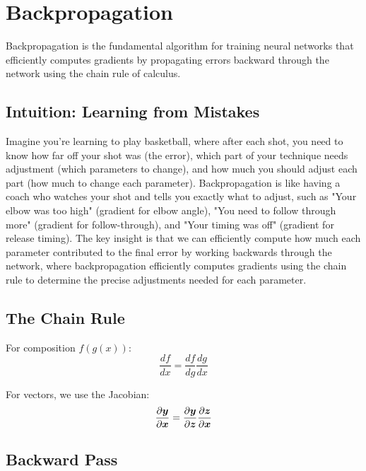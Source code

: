 
\section{Backpropagation }
\label{sec:backpropagation}

Backpropagation is the fundamental algorithm for training neural networks that efficiently computes gradients by propagating errors backward through the network using the chain rule of calculus.

\subsection{Intuition: Learning from Mistakes}

Imagine you're learning to play basketball, where after each shot, you need to know how far off your shot was (the error), which part of your technique needs adjustment (which parameters to change), and how much you should adjust each part (how much to change each parameter). Backpropagation is like having a coach who watches your shot and tells you exactly what to adjust, such as "Your elbow was too high" (gradient for elbow angle), "You need to follow through more" (gradient for follow-through), and "Your timing was off" (gradient for release timing). The key insight is that we can efficiently compute how much each parameter contributed to the final error by working backwards through the network, where backpropagation efficiently computes gradients using the chain rule to determine the precise adjustments needed for each parameter.

\subsection{The Chain Rule}

For composition $f(g(x))$:
\begin{equation}
\frac{df}{dx} = \frac{df}{dg} \frac{dg}{dx}
\end{equation}

For vectors, we use the Jacobian:
\begin{equation}
\frac{\partial \boldsymbol{y}}{\partial \boldsymbol{x}} = \frac{\partial \boldsymbol{y}}{\partial \boldsymbol{z}} \frac{\partial \boldsymbol{z}}{\partial \boldsymbol{x}}
\end{equation}

\subsection{Backward Pass}


